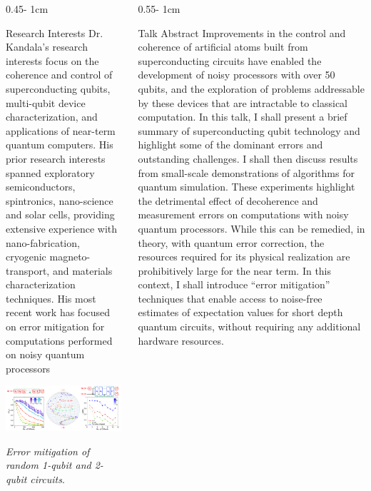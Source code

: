 \documentclass{../psuposter}
\begin{document}
\begin{frame}
\begin{columns}[t, totalwidth=\textwidth]
\begin{column}{0.45\textwidth - 1cm}
    \begin{block}{Research Interests}
        Dr. Kandala's research interests focus on the coherence and control of superconducting qubits, multi-qubit device characterization, and applications of near-term quantum computers. His prior research interests spanned exploratory semiconductors, spintronics, nano-science and solar cells, providing extensive experience with nano-fabrication, cryogenic magneto-transport, and materials characterization techniques. His most recent work has focused on error mitigation for computations performed on noisy quantum processors \cite{Kandala}
        \begin{center}
	    	\includegraphics[width=0.98\textwidth]{images/error-mitigation}    		
    	\end{center}
    	\textit{Error mitigation of random 1-qubit and 2-qubit circuits}. \cite{kandalaExtendingComputationalReach2019}
    \end{block}
\end{column}
\begin{column}{0.55\textwidth - 1cm}


    \begin{block}{Talk Abstract}
        Improvements in the control and coherence of artificial atoms built from superconducting circuits have enabled the development of noisy processors with over 50 qubits, and the exploration of problems addressable by these devices that are intractable to classical computation. In this talk, I shall present a brief summary of superconducting qubit technology and highlight some of the dominant errors and outstanding challenges. I shall then discuss results from small-scale demonstrations of algorithms for quantum simulation. These experiments highlight the detrimental effect of decoherence and measurement errors on computations with noisy quantum processors. While this can be remedied, in theory, with quantum error correction, the resources required for its physical realization are prohibitively large for the near term. In this context, I shall introduce “error mitigation” techniques that enable access to noise-free estimates of expectation values for short depth quantum circuits, without requiring any additional hardware resources.  
    \end{block}



\end{column}
\end{columns}
\end{frame}
\end{document}
